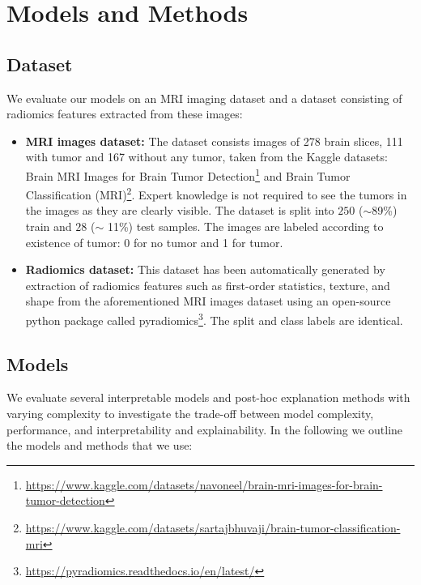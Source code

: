 \section{Models and Methods}
\label{sec:models_and_methods}
\subsection{Dataset}
We evaluate our models on an MRI imaging dataset and a dataset consisting of radiomics features extracted from these images:

\begin{itemize}[leftmargin=0cm]
    \setlength\itemsep{0.6em}
    \item[]
    \textbf{MRI images dataset:} The dataset consists images of 278 brain slices, 111 with tumor and 167 without any tumor, taken from the Kaggle datasets: Brain MRI Images for Brain Tumor Detection\footnote{\url{https://www.kaggle.com/datasets/navoneel/brain-mri-images-for-brain-tumor-detection}} and Brain Tumor Classification (MRI)\footnote{\url{https://www.kaggle.com/datasets/sartajbhuvaji/brain-tumor-classification-mri}}. Expert knowledge is not required to see the tumors in the images as they are clearly visible. The dataset is split into $250$ ($\sim$89\%) train and $28$ ($\sim$ 11\%) test samples. The images are labeled according to existence of tumor: 0 for no tumor and 1 for tumor.
    
    \item[]
    \textbf{Radiomics dataset:} This dataset has been automatically generated by extraction of radiomics features such as first-order statistics, texture, and shape from the aforementioned MRI images dataset using an open-source python package called pyradiomics\footnote{\url{https://pyradiomics.readthedocs.io/en/latest/}}. The split and class labels are identical.
    \end{itemize}

\subsection{Models}
We evaluate several interpretable models and post-hoc explanation methods with varying complexity to investigate the trade-off between model complexity, performance, and interpretability and explainability. In the following we outline the models and methods that we use:

